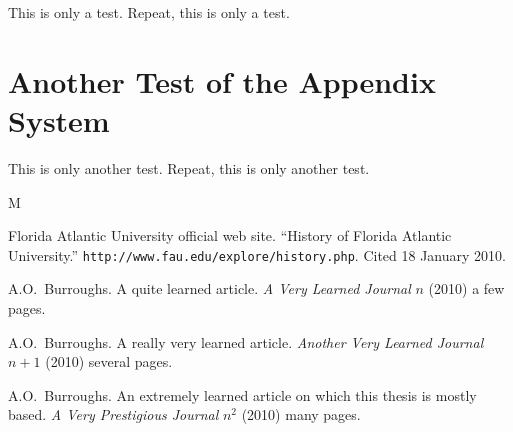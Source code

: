 \documentclass{article}
\begin{document}
This is only a test.  Repeat, this is only a test.


\chapter{Another Test of the Appendix System}

This is only another test.  Repeat, this is only another test.



\begin{thebibliography}{M}

	Florida Atlantic University official web site.
	``History of Florida Atlantic University.''
	\texttt{http://www.fau.edu/explore/history.php}.
	Cited 18 January 2010.

	A.O.~Burroughs.
	A quite learned article.
	\textit{A Very Learned Journal}	{\boldmath $n$} (2010) a few pages.

	A.O.~Burroughs.  
	A really very learned article.
	\textit{Another Very Learned Journal} {\boldmath $n+1$} (2010) several pages.

	A.O.~Burroughs.  
	An extremely learned article on which this thesis is mostly based.
	\textit{A Very Prestigious Journal} {\boldmath $n^2$} (2010) many pages.

\end{thebibliography}
\end{document}
